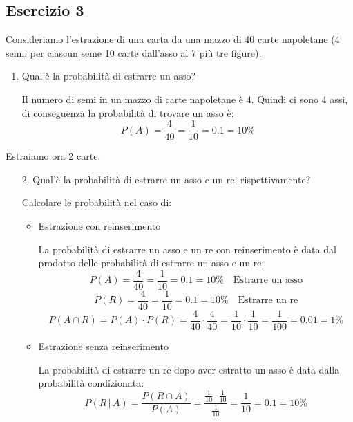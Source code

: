 \documentclass[a4paper]{article}
\theoremstyle{break}
\theoremstyle{break}
\theoremstyle{break}
\theoremstyle{break}
\begin{document}
\subsection{Esercizio 3}
Consideriamo l’estrazione di una carta da una mazzo di 40 carte napoletane (4 semi; per
ciascun seme 10 carte dall’asso al 7 più tre figure).
\begin{enumerate}
	\item Qual'è la probabilità di estrarre un asso?

	      \vspace{1em}
	      \noindent Il numero di semi in un mazzo di carte napoletane è 4. Quindi ci sono 4
	      assi, di conseguenza la probabilità di trovare un asso è:
	      \[
		      P(A) = \frac{4}{40} = \frac{1}{10} = 0.1 = 10\%
	      \]
\end{enumerate}
Estraiamo ora 2 carte.
\begin{enumerate}
	\item[2.] Qual'è la probabilità di estrarre un asso e un re, rispettivamente?

	      \noindent Calcolare le probabilità nel caso di:
	      \begin{itemize}
		      \item Estrazione con reinserimento

		            \vspace{1em}
		            \noindent La probabilità di estrarre un asso e un re con reinserimento è data dal
		            prodotto delle probabilità di estrarre un asso e un re:
		            \[
			            P(A) = \frac{4}{40} = \frac{1}{10} = 0.1 = 10\% \quad \text{Estrarre un asso}
		            \]
		            \[
			            P(R) = \frac{4}{40} = \frac{1}{10} = 0.1 = 10\% \quad \text{Estrarre un re}
		            \]
		            \[
			            P(A \cap R) = P(A) \cdot P(R) = \frac{4}{40} \cdot \frac{4}{40} = \frac{1}{10} \cdot \frac{1}{10} = \frac{1}{100} = 0.01 = 1\%
		            \]
		      \item Estrazione senza reinserimento

		            \vspace{1em}
		            La probabilità di estrarre un re dopo aver estratto un asso è data dalla
		            probabilità condizionata:
		            \[
			            P(R\,|\,A) = \frac{P(R \cap A)}{P(A)} = \frac{\frac{1}{10} \cdot \frac{1}{10}}{\frac{1}{10}} = \frac{1}{10} = 0.1 = 10\%
		            \]
	      \end{itemize}
\end{enumerate}
\end{document}
